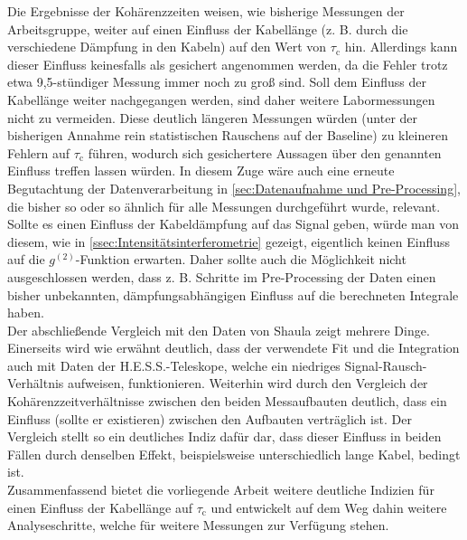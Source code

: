 Die Ergebnisse der Kohärenzzeiten weisen, wie bisherige Messungen der Arbeitsgruppe, weiter auf einen Einfluss der Kabellänge (z. B. durch die verschiedene Dämpfung in den Kabeln) auf den Wert von $\tau_\mathrm{c}$ hin. 
Allerdings kann dieser Einfluss keinesfalls als gesichert angenommen werden, da die Fehler trotz etwa 9{,}5-stündiger Messung immer noch zu groß sind. 
Soll dem Einfluss der Kabellänge weiter nachgegangen werden, sind daher weitere Labormessungen nicht zu vermeiden. 
Diese deutlich längeren Messungen würden (unter der bisherigen Annahme rein statistischen Rauschens auf der Baseline) zu kleineren Fehlern auf $\tau_\mathrm{c}$ führen, wodurch sich gesichertere Aussagen über den genannten Einfluss treffen lassen würden. 
In diesem Zuge wäre auch eine erneute Begutachtung der Datenverarbeitung in \autoref{sec:Datenaufnahme und Pre-Processing}, die bisher so oder so ähnlich für alle Messungen durchgeführt wurde, relevant. 
Sollte es einen Einfluss der Kabeldämpfung auf das Signal geben, würde man von diesem, wie in \autoref{ssec:Intensitätsinterferometrie} gezeigt, eigentlich keinen Einfluss auf die $g^{(2)}$-Funktion erwarten. 
Daher sollte auch die Möglichkeit nicht ausgeschlossen werden, dass z. B. Schritte im Pre-Processing der Daten einen bisher unbekannten, dämpfungsabhängigen Einfluss auf die berechneten Integrale haben. \\
Der abschließende Vergleich mit den Daten von Shaula zeigt mehrere Dinge. 
Einerseits wird wie erwähnt deutlich, dass der verwendete Fit und die Integration auch mit Daten der H.E.S.S.-Teleskope, welche ein niedriges Signal-Rausch-Verhältnis aufweisen, funktionieren. 
Weiterhin wird durch den Vergleich der Kohärenzzeitverhältnisse zwischen den beiden Messaufbauten deutlich, dass ein Einfluss (sollte er existieren) zwischen den Aufbauten verträglich ist. 
Der Vergleich stellt so ein deutliches Indiz dafür dar, dass dieser Einfluss in beiden Fällen durch denselben Effekt, beispielsweise unterschiedlich lange Kabel, bedingt ist. \\

Zusammenfassend bietet die vorliegende Arbeit weitere deutliche Indizien für einen Einfluss der Kabellänge auf $\tau_\mathrm{c}$ und entwickelt auf dem Weg dahin weitere Analyseschritte, welche für weitere Messungen zur Verfügung stehen. 


